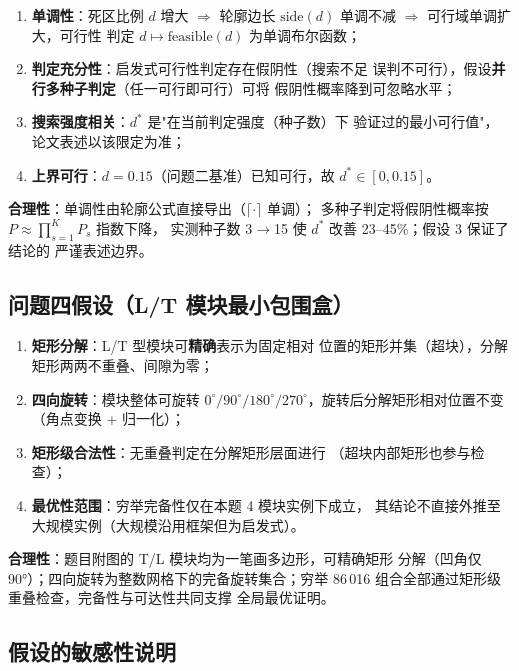 \documentclass[12pt,a4paper]{article}
\begin{document}
\begin{enumerate}[leftmargin=2em]
    \item \textbf{单调性}：死区比例 $d$ 增大 $\Rightarrow$ 轮廓边长
    $\text{side}(d)$ 单调不减 $\Rightarrow$ 可行域单调扩大，可行性
    判定 $d \mapsto \text{feasible}(d)$ 为单调布尔函数；
    \item \textbf{判定充分性}：启发式可行性判定存在假阴性（搜索不足
    误判不可行），假设\textbf{并行多种子判定}（任一可行即可行）可将
    假阴性概率降到可忽略水平；
    \item \textbf{搜索强度相关}：$d^*$ 是"在当前判定强度（种子数）下
    验证过的最小可行值"，论文表述以该限定为准；
    \item \textbf{上界可行}：$d = 0.15$（问题二基准）已知可行，故
    $d^* \in [0, 0.15]$。
\end{enumerate}

\textbf{合理性}：单调性由轮廓公式直接导出（$\lceil\cdot\rceil$ 单调）；
多种子判定将假阴性概率按 $P \approx \prod_{s=1}^{K} P_s$ 指数下降，
实测种子数 3$\to$15 使 $d^*$ 改善 23--45\%；假设 3 保证了结论的
严谨表述边界。

\subsection{问题四假设（L/T 模块最小包围盒）}

\begin{enumerate}[leftmargin=2em]
    \item \textbf{矩形分解}：L/T 型模块可\textbf{精确}表示为固定相对
    位置的矩形并集（超块），分解矩形两两不重叠、间隙为零；
    \item \textbf{四向旋转}：模块整体可旋转 $0^\circ/90^\circ/180^\circ/
    270^\circ$，旋转后分解矩形相对位置不变（角点变换 + 归一化）；
    \item \textbf{矩形级合法性}：无重叠判定在分解矩形层面进行
    （超块内部矩形也参与检查）；
    \item \textbf{最优性范围}：穷举完备性仅在本题 4 模块实例下成立，
    其结论不直接外推至大规模实例（大规模沿用框架但为启发式）。
\end{enumerate}

\textbf{合理性}：题目附图的 T/L 模块均为一笔画多边形，可精确矩形
分解（凹角仅 90°）；四向旋转为整数网格下的完备旋转集合；穷举
86\,016 组合全部通过矩形级重叠检查，完备性与可达性共同支撑
全局最优证明。

\subsection{假设的敏感性说明}
\end{document}
